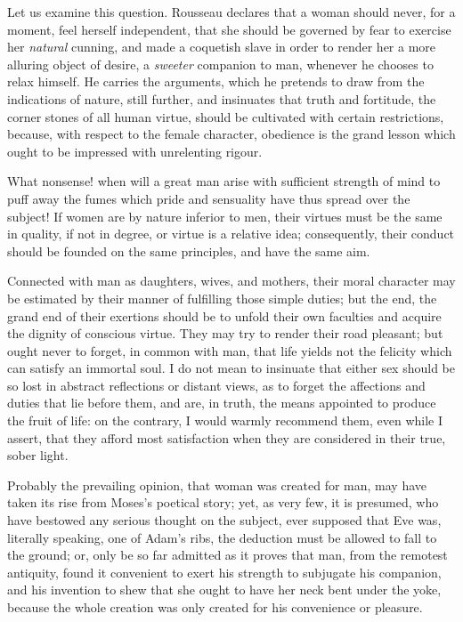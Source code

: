 Let us examine this question. Rousseau declares that a woman should
never, for a moment, feel herself independent, that she should be
governed by fear to exercise her \textit{natural} cunning, and made a
coquetish slave in order to render her a more alluring object of
desire, a \textit{sweeter} companion to man, whenever he chooses to
relax himself. He carries the arguments, which he pretends to draw
from the indications of nature, still further, and insinuates that
truth and fortitude, the corner stones of all human virtue, should be
cultivated with certain restrictions, because, with respect to the
female character, obedience is the grand lesson which ought to be
impressed with unrelenting rigour.


What nonsense! when will a great man arise with sufficient strength of
mind to puff  away the fumes which pride and sensuality have
thus spread over the subject! If women are by nature inferior to men,
their virtues must be the same in quality, if not in degree, or
virtue is a relative idea; consequently, their conduct should be
founded on the same principles, and have the same aim.

Connected with man as daughters, wives, and mothers, their moral
character may be estimated by their manner of fulfilling those simple
duties; but the end, the grand end of their exertions should be to
unfold their own faculties and acquire the dignity of conscious
virtue. They may try to render their road pleasant; but ought never to
forget, in common with man, that life yields not the felicity which
can satisfy an immortal soul. I do not mean to insinuate that either
sex should be so lost in abstract reflections or distant views, as to
forget the affections and duties that lie before them, and are, in
truth, the means appointed to produce the fruit of life: on the
contrary, I would warmly recommend them, even while I assert, that
they afford most satisfaction when they are considered in their true,
sober light.

Probably the prevailing opinion, that woman was created for man, may
have taken  its rise from Moses's poetical story; yet, as
very few, it is presumed, who have bestowed any serious thought on the
subject, ever supposed that Eve was, literally speaking, one of Adam's
ribs, the deduction must be allowed to fall to the ground; or, only be
so far admitted as it proves that man, from the remotest antiquity,
found it convenient to exert his strength to subjugate his companion,
and his invention to shew that she ought to have her neck bent under
the yoke, because the whole creation was only created for his
convenience or pleasure.

